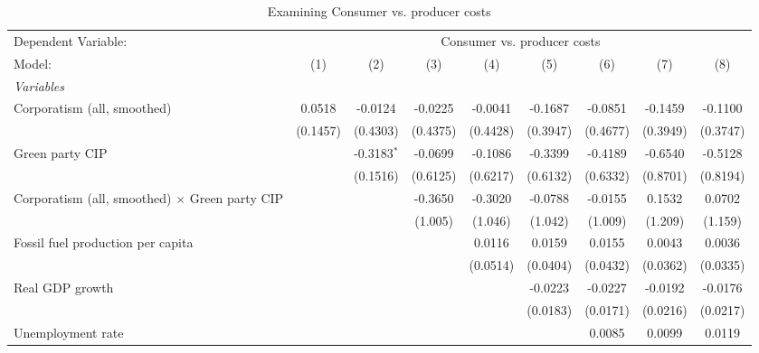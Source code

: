 
\begin{table}[htbp]
   \caption{Examining Consumer vs. producer costs}
   \centering
   \begin{tabular}{lcccccccc}
      \tabularnewline \midrule \midrule
      Dependent Variable: & \multicolumn{8}{c}{Consumer vs. producer costs}\\
      Model:                                                & (1)      & (2)           & (3)      & (4)      & (5)      & (6)      & (7)      & (8)\\  
      \midrule
      \emph{Variables}\\
      Corporatism (all, smoothed)                           & 0.0518   & -0.0124       & -0.0225  & -0.0041  & -0.1687  & -0.0851  & -0.1459  & -0.1100\\   
                                                            & (0.1457) & (0.4303)      & (0.4375) & (0.4428) & (0.3947) & (0.4677) & (0.3949) & (0.3747)\\   
      Green party CIP                                       &          & -0.3183$^{*}$ & -0.0699  & -0.1086  & -0.3399  & -0.4189  & -0.6540  & -0.5128\\   
                                                            &          & (0.1516)      & (0.6125) & (0.6217) & (0.6132) & (0.6332) & (0.8701) & (0.8194)\\   
      Corporatism (all, smoothed) $\times$ Green party CIP  &          &               & -0.3650  & -0.3020  & -0.0788  & -0.0155  & 0.1532   & 0.0702\\   
                                                            &          &               & (1.005)  & (1.046)  & (1.042)  & (1.009)  & (1.209)  & (1.159)\\   
      Fossil fuel production per capita                     &          &               &          & 0.0116   & 0.0159   & 0.0155   & 0.0043   & 0.0036\\   
                                                            &          &               &          & (0.0514) & (0.0404) & (0.0432) & (0.0362) & (0.0335)\\   
      Real GDP growth                                       &          &               &          &          & -0.0223  & -0.0227  & -0.0192  & -0.0176\\   
                                                            &          &               &          &          & (0.0183) & (0.0171) & (0.0216) & (0.0217)\\   
      Unemployment rate                                     &          &               &          &          &          & 0.0085   & 0.0099   & 0.0119\\   

\end{tabular}
\end{table}
